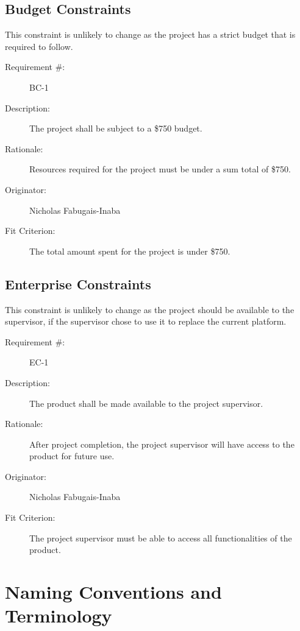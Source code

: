\documentclass[12pt]{article}
\newenvironment{myreq}[1]{%
\setlist[description]{font=\normalfont\color{darkgray}}%
\begin{tcolorbox}[colframe=black,colback=white, sharp corners, boxrule=1pt]%
\bfseries\color{blue}%
\begin{description}#1}%
{\end{description}\end{tcolorbox}}
\newcommand{\twoinline}[2]{\begin{multicols}{2}#1 #2\end{multicols}}
\newcommand{\reqno}{\item[Requirement \#:]}
\newcommand{\reqdesc}{\item[Description:]}
\newcommand{\reqrat}{\item[Rationale:]}
\newcommand{\reqorig}{\item[Originator:]}
\newcommand{\reqfit}{\item[Fit Criterion:]}
\newcommand{\reqsatis}{\item[Customer Satisfaction:]}
\newcommand{\reqdissat}{\item[Customer Dissatisfaction:]}
\begin{document}
\subsection{Budget Constraints}

This constraint is unlikely to change as the project has a strict budget that
is required to follow.

\begin{myreq}
  \reqno BC-1
  \reqdesc The project shall be subject to a \$750 budget.
  \reqrat Resources required for the project must be under a sum total of
  \$750.
  \reqorig Nicholas Fabugais-Inaba
  \reqfit The total amount spent for the project is under \$750.
  \twoinline
    {\reqsatis 1}
    {\reqdissat 1}
\end{myreq}

\subsection{Enterprise Constraints}

This constraint is unlikely to change as the project should be available to the
supervisor, if the supervisor chose to use it to replace the current platform.

\begin{myreq}
  \reqno EC-1
  \reqdesc The product shall be made available to the project supervisor.
  \reqrat After project completion, the project supervisor will have
  access to the product for future use. 
  \reqorig Nicholas Fabugais-Inaba
  \reqfit The project supervisor must be able to access all functionalities
  of the product.
  \twoinline
    {\reqsatis 5}
    {\reqdissat 5}
\end{myreq}

\section{Naming Conventions and Terminology}
\end{document}
